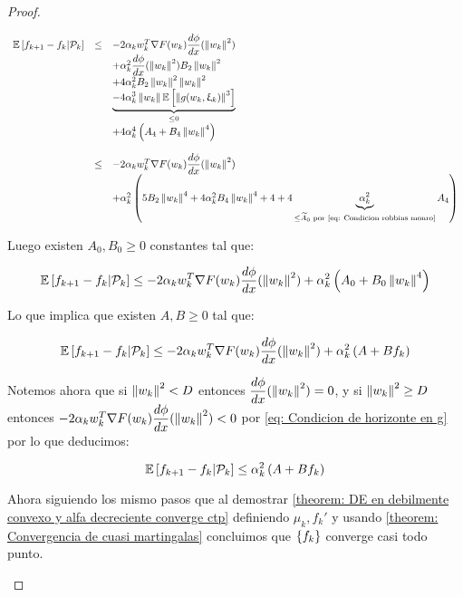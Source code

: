 \begin{proof}
\begin{enumerate}
		\begin{equation*}
		\begin{array}{rcl}
		\mathbb{E} \left[{f_{k+1} - f_k} \vert \mathcal{P}_{k}\right] & \leq & -2 \alpha_k w_k^T\nabla F (w_k)\dfrac{d \phi}{dx}(\left\lVert w_k\right\rVert^2) \\ 
		&& + \alpha_k^2 \dfrac{d \phi}{dx}(\left\lVert w_k\right\rVert^2) B_2\left\lVert w_k\right\rVert^2 \\ 
		& & + 4 \alpha_k^2 B_2\left\lVert w_k\right\rVert^2 \left\lVert w_k\right\rVert^2 \\
		& & \underbrace{-4 \alpha_k^3 \left\lVert w_k\right\rVert \mathbb{E} \left[\left\lVert g(w_k, \upxi_{k})\right\rVert^3\right]}_{\leq 0}\\
		& & + 4 \alpha_k^4 \left(A_4 + B_4 \left\lVert w_k\right\rVert^4\right)\\
		& & \\
		& \leq & -2 \alpha_k w_k^T\nabla F (w_k)\dfrac{d \phi}{dx}(\left\lVert w_k\right\rVert^2)  \\
		& & + \alpha_k^2 \left(5B_2 \left\lVert w_k\right\rVert^4 + 4 \alpha_k^2 B_4 \left\lVert w_k\right\rVert^4 + 4 + 4 \underbrace{\alpha_k^2}_{\leq \widetilde{A}_0 \text{ por \ref{eq: Condicion robbins monro}}} A_4\right)
		\end{array} 
		\end{equation*}
		
		Luego existen $A_0, B_0 \geq 0$ constantes tal que:
		
		\begin{equation*}
		\mathbb{E} \left[{f_{k+1} - f_k} \vert \mathcal{P}_{k}\right] \leq -2 \alpha_k w_k^T\nabla F (w_k)\dfrac{d \phi}{dx}(\left\lVert w_k\right\rVert^2) + \alpha_k^2 \left(A_0 + B_0 \left\lVert w_k\right\rVert^4\right)
		\end{equation*}
		
		 Lo que implica que existen $A,B \geq 0$ tal que:
		
		\begin{equation*}
		\mathbb{E} \left[{f_{k+1} - f_k} \vert \mathcal{P}_{k}\right] \leq -2 \alpha_k w_k^T\nabla F (w_k)\dfrac{d \phi}{dx}(\left\lVert w_k\right\rVert^2)  + \alpha_k^2\left(A + B f_k\right)
		\end{equation*}
		
		Notemos ahora que si $\left\lVert w_k\right\rVert^2 < D$ entonces $\dfrac{d \phi}{dx}(\left\lVert w_k\right\rVert^2) = 0$, y si $\left\lVert w_k\right\rVert^2 \geq D$ entonces $-2 \alpha_k w_k^T\nabla F (w_k)\dfrac{d \phi}{dx}(\left\lVert w_k\right\rVert^2) < 0$ por \ref{eq: Condicion de horizonte en g} por lo que deducimos:
		
		\begin{equation}
		\mathbb{E} \left[{f_{k+1} - f_k} \vert \mathcal{P}_{k}\right] \leq \alpha_k^2\left(A + B f_k\right)
		\end{equation}	
		
		Ahora siguiendo los mismo pasos que al demostrar \ref{theorem: DE en debilmente convexo y alfa decreciente converge ctp} definiendo $\mu_k, f_k'$ y usando \ref{theorem: Convergencia de cuasi martingalas} concluimos que $\left\lbrace f_k\right\rbrace$ converge casi todo punto.
		

\end{enumerate}
\end{proof}

